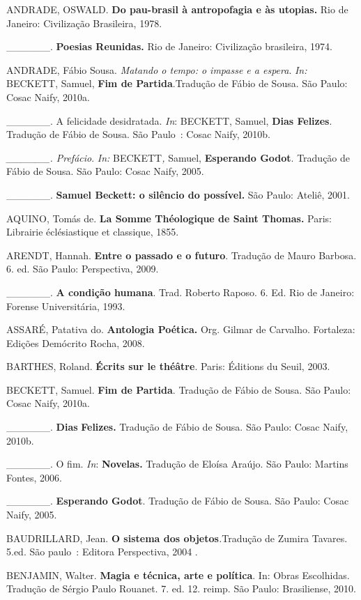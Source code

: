 ANDRADE, OSWALD. \textbf{Do pau-brasil à antropofagia e às utopias.} Rio
de Janeiro: Civilização Brasileira, 1978.

\_\_\_\_\_\_. \textbf{Poesias Reunidas.} Rio de Janeiro: Civilização
brasileira, 1974.

ANDRADE, Fábio Sousa. \emph{Matando o tempo: o impasse e a espera}.
\emph{In:} BECKETT, Samuel, \textbf{Fim de Partida}.Tradução de Fábio de
Sousa. São Paulo: Cosac Naify, 2010a.

\_\_\_\_\_\_. A felicidade desidratada. \emph{In}: BECKETT, Samuel,
\textbf{Dias Felizes}. Tradução de Fábio de Sousa. São Paulo~: Cosac
Naify, 2010b.

\emph{\_\_\_\_\_\_. Prefácio}. \emph{In:} BECKETT\emph{,} Samuel,
\textbf{Esperando Godot}. Tradução de Fábio de Sousa. São Paulo: Cosac
Naify, 2005.

\_\_\_\_\_\_. \textbf{Samuel Beckett: o silêncio do possível.} São
Paulo: Ateliê, 2001.

AQUINO, Tomás de. \textbf{La Somme Théologique de Saint Thomas.} Paris:
Librairie éclésiastique et classique, 1855.

ARENDT, Hannah. \textbf{Entre o passado e o futuro}. Tradução de Mauro
Barbosa. 6. ed. São Paulo: Perspectiva, 2009.

\_\_\_\_\_\_. \textbf{A condição humana}. Trad. Roberto Raposo. 6. Ed.
Rio de Janeiro: Forense Universitária, 1993.

ASSARÉ, Patativa do. \textbf{Antologia Poética.} Org. Gilmar de
Carvalho. Fortaleza: Edições Demócrito Rocha, 2008.

BARTHES, Roland. \textbf{Écrits sur le théâtre}. Paris: Éditions du
Seuil, 2003.

BECKETT, Samuel. \textbf{Fim de Partida}. Tradução de Fábio de Sousa.
São Paulo: Cosac Naify, 2010a.

\_\_\_\_\_\_. \textbf{Dias} \textbf{Felizes.} Tradução de Fábio de
Sousa. São Paulo: Cosac Naify, 2010b.

\_\_\_\_\_\_. O fim. \emph{In}: \textbf{Novelas.} Tradução de Eloísa
Araújo. São Paulo: Martins Fontes, 2006.

\_\_\_\_\_\_. \textbf{Esperando Godot}. Tradução de Fábio de Sousa. São
Paulo: Cosac Naify, 2005.

BAUDRILLARD, Jean. \textbf{O sistema dos objetos}\emph{.}Tradução de
Zumira Tavares. 5.ed. São paulo~: Editora Perspectiva, 2004 .

BENJAMIN, Walter. \textbf{Magia e técnica, arte e política}. In: Obras
Escolhidas. Tradução de Sérgio Paulo Rouanet. 7. ed. 12. reimp. São
Paulo: Brasiliense, 2010.

